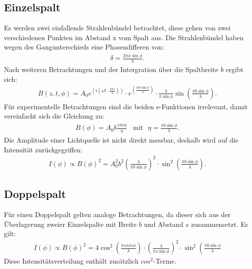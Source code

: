 \subsection{Einzelspalt}
Es werden zwei einfallende Strahlenbündel betrachtet, diese gehen von zwei verschiedenen Punkten im Abstand x vom
Spalt aus. Die Strahlenbündel haben wegen des Gangunterschieds eine Phasendifferen von:
\begin{align}
\delta = \frac{2\pi x \sin\phi}{\lambda}.
\end{align}
Nach weiteren Betrachtungen und der Intergration über die Spaltbreite $b$ ergibt sich:
\begin{align}
B(z,t,\phi)=A_0 e^{\left(i\left(\omega t\cdot\frac{2\pi z}{\lambda}\right)\right)}\cdot e^{\left(\frac{\pi i b\sin\phi}{\lambda}\right)}\cdot\frac{\lambda}{\pi\sin\phi}\sin\left(\frac{\pi b \sin\phi}{\lambda}\right).
\end{align}
Für experimentelle Betrachtungen sind die beiden e-Funktionen irrelevant, damit vereinfacht sich die Gleichung zu:
\begin{align}
B(\phi)=A_0 b \frac{sin \eta}{\eta} \ \ \ \ \text{mit} \ \ \ \eta=\frac{\pi b \sin \phi}{\lambda}.
\end{align}
Die Amplitude einer Lichtquelle ist nicht direkt messbar, deshalb wird auf die Intensität zurückgegriffen:
\begin{align}
I(\phi)\propto B(\phi)^2 = A_0^2 b^2\left(\frac{\lambda}{\pi b \sin\phi}\right)^2\cdot\sin^2\left(\frac{\pi b \sin\phi}{\lambda}\right).
\end{align}
\subsection{Doppelspalt}
Für einen Doppelspalt gelten analoge Betrachtungen, da dieser sich aus der Überlagerung zweier Einzelspalte
mit Breite $b$ und Abstand $s$ zusammensetzt. Es gilt:
\begin{align}
I(\phi) \propto B(\phi)^2 = 4\cos^2\left(\frac{\pi s sin\phi}{\lambda}\right)\cdot\left(\frac{\lambda}{\pi s \sin\phi}\right)^2\cdot\sin^2\left(\frac{\pi b \sin\phi}{\lambda}\right.
\end{align}
Diese Intensitätsverteilung enthält zusätzlich $cos^2$-Terme.
